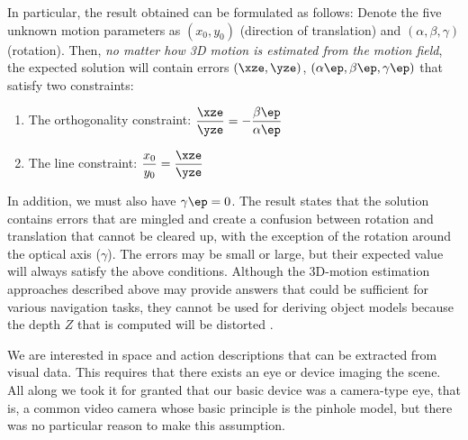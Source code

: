 \documentclass[10pt,twocolumn]{article}
\begin{document}
In particular, the result obtained can be formulated as follows:
Denote the five unknown motion parameters as $(x_0, y_0)$ (direction
of translation) and $(\alpha, \beta, \gamma)$ (rotation). Then,
\emph{no matter how 3D motion is estimated from the motion field}, the
expected solution will contain errors $(\xze, \yze)$, $(\alpha\ep, \beta\ep,
\gamma\ep)$ that satisfy two constraints:
\begin{enumerate} %
\renewcommand{\labelenumi}{(\alph{enumi})}
\item The orthogonality constraint: 
$\displaystyle
    \frac{\xze}{\yze} = -\frac{\beta\ep}{\alpha\ep}
$
\item The line constraint:
$\displaystyle
    \frac{x_0}{y_0} = \frac{\xze}{\yze}
$
\end{enumerate}
In addition, we must also have $\gamma\ep = 0$. The result states that
the solution contains errors that are mingled and create a confusion
between rotation and translation that cannot be cleared up, with the
exception of the rotation around the optical axis ($\gamma$). The
errors may be small or large, but their expected value will always
satisfy the above conditions. Although the 3D-motion estimation
approaches described above may provide answers that could be
sufficient for various navigation tasks, they cannot be used for
deriving object models because the depth $Z$ that is computed will be distorted \cite{cheongetal97}.

We are interested in space and action descriptions that
can be extracted from visual data. This requires that there exists an
eye or device imaging the scene. All along we took it for granted that
our basic device was a camera-type eye, that is, a common video camera
whose basic principle is the pinhole model, but there was no
particular reason to make this assumption.
\end{document}
